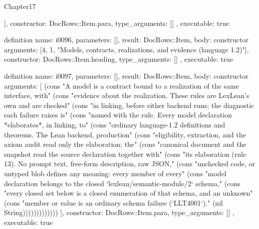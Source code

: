 \begin{lexlean}{Chapter17}
\begin{semanticmodule}
{{    ],
    constructor: DocRows::Item.para,
    type_arguments: []
  },
  executable: true
}

definition{
  name: i0096,
  parameters: [],
  result: DocRows::Item,
  body: constructor{
    arguments: [4, 1, "Models, contracts, realizations, and evidence (language 1.2)"],
    constructor: DocRows::Item.heading,
    type_arguments: []
  },
  executable: true
}

definition{
  name: i0097,
  parameters: [],
  result: DocRows::Item,
  body: constructor{
    arguments: [
      (cons "A model is a contract bound to a realization of the same interface, with" (cons "evidence about the realization. These rules are LexLean's own and are checked" (cons "in linking, before either backend runs; the diagnostic each failure raises is" (cons "named with the rule. Every model declaration *elaborates*, in linking, to" (cons "ordinary language-1.2 definitions and theorems. The Lean backend, production" (cons "eligibility, extraction, and the axiom audit read only the elaboration; the" (cons "canonical document and the snapshot read the source declaration together with" (cons "its elaboration (rule 13). No prompt text, free-form description, raw JSON," (cons "unchecked code, or untyped blob defines any meaning: every member of every" (cons "model declaration belongs to the closed `lexlean/semantic-module/2` schema," (cons "every closed set below is a closed enumeration of that schema, and an unknown" (cons "member or value is an ordinary schema failure (`LLT4001`)." (nil String)))))))))))))
    ],
    constructor: DocRows::Item.para,
    type_arguments: []
  },
  executable: true
}


\end{semanticmodule}
\end{lexlean}
